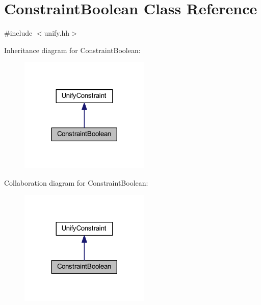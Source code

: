 \hypertarget{class_constraint_boolean}{}\section{Constraint\+Boolean Class Reference}
\label{class_constraint_boolean}


{\ttfamily \#include $<$unify.\+hh$>$}



Inheritance diagram for Constraint\+Boolean\+:
\nopagebreak
\begin{figure}[H]
\begin{center}
\leavevmode
\includegraphics[width=176pt]{class_constraint_boolean__inherit__graph}
\end{center}
\end{figure}


Collaboration diagram for Constraint\+Boolean\+:
\nopagebreak
\begin{figure}[H]
\begin{center}
\leavevmode
\includegraphics[width=176pt]{class_constraint_boolean__coll__graph}
\end{center}
\end{figure}

